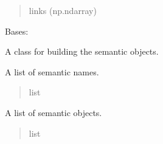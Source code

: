 \documentclass[letterpaper,10pt,english]{sphinxmanual}
\begin{document}
\begin{fulllineitems}
\begin{fulllineitems}
\begin{quote}
\begin{description}
\sphinxAtStartPar
links (np.ndarray)

\end{description}\end{quote}

\end{fulllineitems}


\end{fulllineitems}


\begin{fulllineitems}
\label{\detokenize{nodes:nodes.nodeBuilder.Build_sems}}
\pysigstartsignatures
\pysiglinewithargsret
{}
{}
{}
\pysigstopsignatures
\sphinxAtStartPar
Bases: 

\sphinxAtStartPar
A class for building the semantic objects.

\begin{fulllineitems}
\label{\detokenize{nodes:nodes.nodeBuilder.Build_sems.sems}}
\pysigstartsignatures
\pysigline
{}
\pysigstopsignatures
\sphinxAtStartPar
A list of semantic names.
\begin{quote}\begin{description}
\sphinxAtStartPar
list

\end{description}\end{quote}

\end{fulllineitems}


\begin{fulllineitems}
\label{\detokenize{nodes:nodes.nodeBuilder.Build_sems.nodes}}
\pysigstartsignatures
\pysigline
{}
\pysigstopsignatures
\sphinxAtStartPar
A list of semantic objects.
\begin{quote}\begin{description}
\sphinxAtStartPar
list


\end{description}
\end{quote}
\end{fulllineitems}
\end{fulllineitems}
\end{document}
